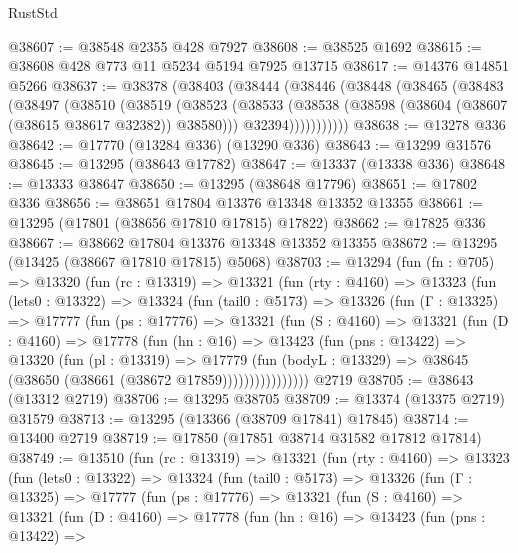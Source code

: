 \begin{lexlean}{RustStd}
\begin{coremodule}
@38607 := @38548 @2355 @428 @7927
@38608 := @38525 @1692
@38615 := @38608 @428 @773 @11 @5234 @5194 @7925 @13715
@38617 := @14376 @14851 @5266
@38637 := @38378
    (@38403
      (@38444
        (@38446
          (@38448
            (@38465
              (@38483
                (@38497
                  (@38510
                    (@38519
                      (@38523
                        (@38533
                          (@38538 (@38598 (@38604 (@38607 (@38615 @38617 @32382)) @38580)))
                          @32394)))))))))))
@38638 := @13278 @336
@38642 := @17770 (@13284 @336) (@13290 @336)
@38643 := @13299 @31576
@38645 := @13295 (@38643 @17782)
@38647 := @13337 (@13338 @336)
@38648 := @13333 @38647
@38650 := @13295 (@38648 @17796)
@38651 := @17802 @336
@38656 := @38651 @17804 @13376 @13348 @13352 @13355
@38661 := @13295 (@17801 (@38656 @17810 @17815) @17822)
@38662 := @17825 @336
@38667 := @38662 @17804 @13376 @13348 @13352 @13355
@38672 := @13295 (@13425 (@38667 @17810 @17815) @5068)
@38703 := @13294
    (fun (fn : @705) =>
    @13320
      (fun (rc : @13319) =>
      @13321
        (fun (rty : @4160) =>
        @13323
          (fun (lets0 : @13322) =>
          @13324
            (fun (tail0 : @5173) =>
            @13326
              (fun (Γ : @13325) =>
              @17777
                (fun (ps : @17776) =>
                @13321
                  (fun (S : @4160) =>
                  @13321
                    (fun (D : @4160) =>
                    @17778
                      (fun (hn : @16) =>
                      @13423
                        (fun (pns : @13422) =>
                        @13320
                          (fun (pl : @13319) =>
                          @17779
                            (fun (bodyL : @13329) =>
                            @38645 (@38650 (@38661 (@38672 @17859))))))))))))))))
    @2719
@38705 := @38643 (@13312 @2719)
@38706 := @13295 @38705
@38709 := @13374 (@13375 @2719) @31579
@38713 := @13295 (@13366 (@38709 @17841) @17845)
@38714 := @13400 @2719
@38719 := @17850 (@17851 @38714 @31582 @17812 @17814)
@38749 := @13510
    (fun (rc : @13319) =>
    @13321
      (fun (rty : @4160) =>
      @13323
        (fun (lets0 : @13322) =>
        @13324
          (fun (tail0 : @5173) =>
          @13326
            (fun (Γ : @13325) =>
            @17777
              (fun (ps : @17776) =>
              @13321
                (fun (S : @4160) =>
                @13321
                  (fun (D : @4160) =>
                  @17778
                    (fun (hn : @16) =>
                    @13423
                      (fun (pns : @13422) =>

\end{coremodule}
\end{lexlean}
